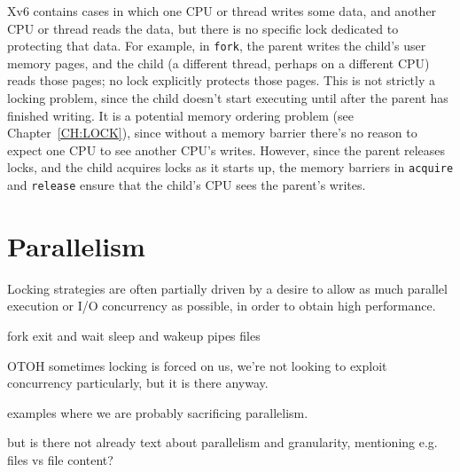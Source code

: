 Xv6 contains cases in which one CPU or thread writes some data, and
another CPU or thread reads the data, but there is no specific lock
dedicated to protecting that data. For example, in {\tt fork}, the
parent writes the child's user memory pages, and the child (a
different thread, perhaps on a different CPU) reads those pages; no
lock explicitly protects those pages. This is not strictly a locking
problem, since the child doesn't start executing until after the parent has
finished writing. It is a potential memory ordering problem
(see Chapter~\ref{CH:LOCK}), since without a memory barrier there's no
reason to expect one CPU to see another CPU's writes. However, since
the parent releases locks, and the child acquires locks as it starts
up, the memory barriers in {\tt acquire} and {\tt release}
ensure that the child's CPU sees the parent's writes.

\section{Parallelism}

Locking strategies are often partially driven by a desire to allow as
much parallel execution or I/O concurrency as possible, in order to
obtain high performance.

fork
exit and wait
sleep and wakeup
pipes
files

OTOH sometimes locking is forced on us, we're not looking to exploit
concurrency particularly, but it is there anyway.

examples where we are probably sacrificing parallelism.

but is there not already text about parallelism and granularity, mentioning
e.g. files vs file content?
